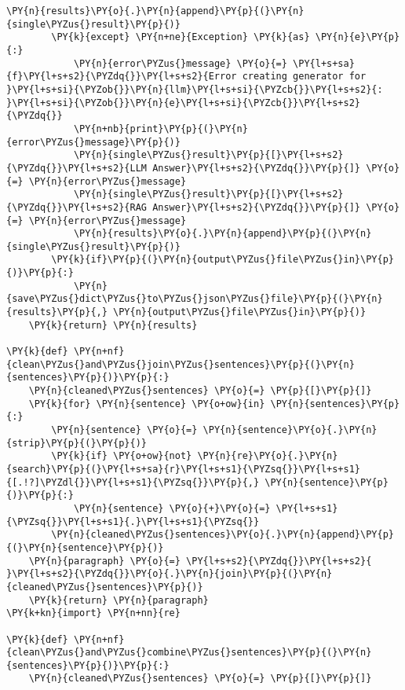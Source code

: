 \documentclass[11pt]{wseas}
\begin{document}
\begin{tcolorbox}[breakable, size=fbox, boxrule=1pt, pad at break*=1mm,colback=cellbackground, colframe=cellborder]
\begin{Verbatim}[commandchars=\\\{\}]
            \PY{n}{results}\PY{o}{.}\PY{n}{append}\PY{p}{(}\PY{n}{single\PYZus{}result}\PY{p}{)}
        \PY{k}{except} \PY{n+ne}{Exception} \PY{k}{as} \PY{n}{e}\PY{p}{:}
            \PY{n}{error\PYZus{}message} \PY{o}{=} \PY{l+s+sa}{f}\PY{l+s+s2}{\PYZdq{}}\PY{l+s+s2}{Error creating generator for }\PY{l+s+si}{\PYZob{}}\PY{n}{llm}\PY{l+s+si}{\PYZcb{}}\PY{l+s+s2}{: }\PY{l+s+si}{\PYZob{}}\PY{n}{e}\PY{l+s+si}{\PYZcb{}}\PY{l+s+s2}{\PYZdq{}}
            \PY{n+nb}{print}\PY{p}{(}\PY{n}{error\PYZus{}message}\PY{p}{)}
            \PY{n}{single\PYZus{}result}\PY{p}{[}\PY{l+s+s2}{\PYZdq{}}\PY{l+s+s2}{LLM Answer}\PY{l+s+s2}{\PYZdq{}}\PY{p}{]} \PY{o}{=} \PY{n}{error\PYZus{}message}
            \PY{n}{single\PYZus{}result}\PY{p}{[}\PY{l+s+s2}{\PYZdq{}}\PY{l+s+s2}{RAG Answer}\PY{l+s+s2}{\PYZdq{}}\PY{p}{]} \PY{o}{=} \PY{n}{error\PYZus{}message}
            \PY{n}{results}\PY{o}{.}\PY{n}{append}\PY{p}{(}\PY{n}{single\PYZus{}result}\PY{p}{)}
        \PY{k}{if}\PY{p}{(}\PY{n}{output\PYZus{}file\PYZus{}in}\PY{p}{)}\PY{p}{:}
            \PY{n}{save\PYZus{}dict\PYZus{}to\PYZus{}json\PYZus{}file}\PY{p}{(}\PY{n}{results}\PY{p}{,} \PY{n}{output\PYZus{}file\PYZus{}in}\PY{p}{)}
    \PY{k}{return} \PY{n}{results}   

\PY{k}{def} \PY{n+nf}{clean\PYZus{}and\PYZus{}join\PYZus{}sentences}\PY{p}{(}\PY{n}{sentences}\PY{p}{)}\PY{p}{:}
    \PY{n}{cleaned\PYZus{}sentences} \PY{o}{=} \PY{p}{[}\PY{p}{]}
    \PY{k}{for} \PY{n}{sentence} \PY{o+ow}{in} \PY{n}{sentences}\PY{p}{:}
        \PY{n}{sentence} \PY{o}{=} \PY{n}{sentence}\PY{o}{.}\PY{n}{strip}\PY{p}{(}\PY{p}{)}
        \PY{k}{if} \PY{o+ow}{not} \PY{n}{re}\PY{o}{.}\PY{n}{search}\PY{p}{(}\PY{l+s+sa}{r}\PY{l+s+s1}{\PYZsq{}}\PY{l+s+s1}{[.!?]\PYZdl{}}\PY{l+s+s1}{\PYZsq{}}\PY{p}{,} \PY{n}{sentence}\PY{p}{)}\PY{p}{:}
            \PY{n}{sentence} \PY{o}{+}\PY{o}{=} \PY{l+s+s1}{\PYZsq{}}\PY{l+s+s1}{.}\PY{l+s+s1}{\PYZsq{}}
        \PY{n}{cleaned\PYZus{}sentences}\PY{o}{.}\PY{n}{append}\PY{p}{(}\PY{n}{sentence}\PY{p}{)}
    \PY{n}{paragraph} \PY{o}{=} \PY{l+s+s2}{\PYZdq{}}\PY{l+s+s2}{ }\PY{l+s+s2}{\PYZdq{}}\PY{o}{.}\PY{n}{join}\PY{p}{(}\PY{n}{cleaned\PYZus{}sentences}\PY{p}{)}
    \PY{k}{return} \PY{n}{paragraph}
\PY{k+kn}{import} \PY{n+nn}{re}

\PY{k}{def} \PY{n+nf}{clean\PYZus{}and\PYZus{}combine\PYZus{}sentences}\PY{p}{(}\PY{n}{sentences}\PY{p}{)}\PY{p}{:}
    \PY{n}{cleaned\PYZus{}sentences} \PY{o}{=} \PY{p}{[}\PY{p}{]}
    

\end{Verbatim}
\end{tcolorbox}
\end{document}
